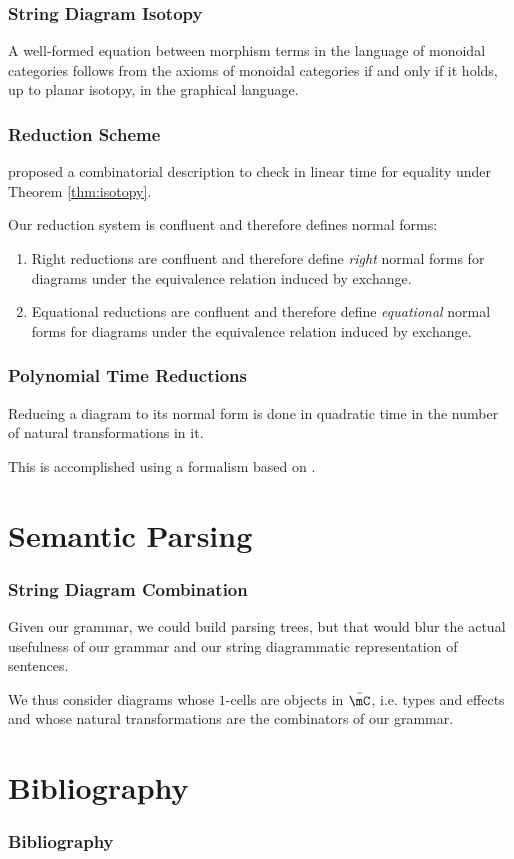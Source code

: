 \documentclass[math, english, info]{beamercours}
\begin{document}
\begin{frame}
	\frametitle{String Diagram Isotopy}
	\begin{thm}
		\label{thm:isotopy}
		A well-formed equation between morphism terms in the language of monoidal categories follows from the axioms of monoidal categories if and only if it holds, up to planar isotopy, in the graphical language.
	\end{thm}
\end{frame}

\begin{frame}
	\frametitle{Reduction Scheme}
	\cite{delpeuchNormalizationPlanarString2022} proposed a combinatorial description to check
	in linear time for equality under Theorem \ref{thm:isotopy}.

	\pause\smallskip

	\begin{thm}[Confluence]\label{thm:confluence}
		Our reduction system is confluent and therefore defines normal forms:
		\begin{enumerate}
			\item Right reductions are confluent and therefore define \emph{right} normal forms for
			      diagrams under the equivalence relation induced by exchange.
			\item Equational reductions are confluent and therefore define \emph{equational}
			      normal forms for diagrams under the equivalence relation induced by exchange.
		\end{enumerate}
	\end{thm}
\end{frame}

\begin{frame}
	\frametitle{Polynomial Time Reductions}
	\begin{thm}
		\label{thm:normalize}
		Reducing a diagram to its normal form is done in quadratic time in
		the number of natural transformations in it.
	\end{thm}
	This is accomplished using a formalism based on \cite{delpeuchNormalizationPlanarString2022}.
\end{frame}

\section{Semantic Parsing}

\begin{frame}
	\frametitle{String Diagram Combination}
	Given our grammar, we could build parsing trees, but that would blur the actual usefulness of our grammar and our string diagrammatic representation of sentences.

	\medskip

	We thus consider diagrams whose $1$-cells are objects in $\bar{\mC}$, i.e. types and effects and whose natural transformations are the combinators of our grammar.
\end{frame}


\section*{Bibliography}

\begin{frame}[allowframebreaks]
	\frametitle{Bibliography}
	\printbibliography{}
\end{frame}
\end{document}
